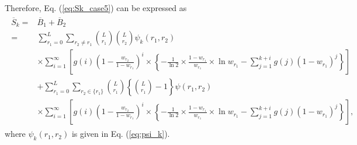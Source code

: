 %
Therefore, Eq. (\ref{eq:Sk_case5}) can be expressed as
\begin{align}\begin{split}
  \overline{S}_k =& \overline{B}_1 + \overline{B}_2 \\
  =& \sum_{r_1=0}^{L} \sum_{r_2 \neq r_1} \binom{L}{r_1}\binom{L}{r_2}\psi_k(r_1,r_2)\\
  &\times\sum_{i=1}^{\infty} \left[ g(i) \left(1-\frac{w_{r_2}}{1-w_{r_1}} \right)^{i} \times \left\{ -\frac{1}{\ln 2} \times \frac{1-w_{r_1}}{w_{r_1}} \times \ln w_{r_1} - \sum_{j=1}^{k+i} g(j)(1-w_{r_1})^{j} \right\} \right] \\
  &+\sum_{r_1=0}^{L} \sum_{r_2 \in \{r_1\}} \binom{L}{r_1}\left\{\binom{L}{r_1}-1\right\} \psi(r_1,r_2) \\
  &\times\sum_{i=1}^{\infty} \left[ g(i) \left(1-\frac{w_{r_2}}{1-w_{r_1}} \right)^{i} \times \left\{ -\frac{1}{\ln 2} \times \frac{1-w_{r_1}}{w_{r_1}} \times \ln w_{r_1} - \sum_{j=1}^{k+i} g(j)(1-w_{r_1})^{j} \right\} \right],
\end{split}\end{align}
where $\psi_k(r_1,r_2)$ is given in Eq. (\ref{eq:psi_k}).


















